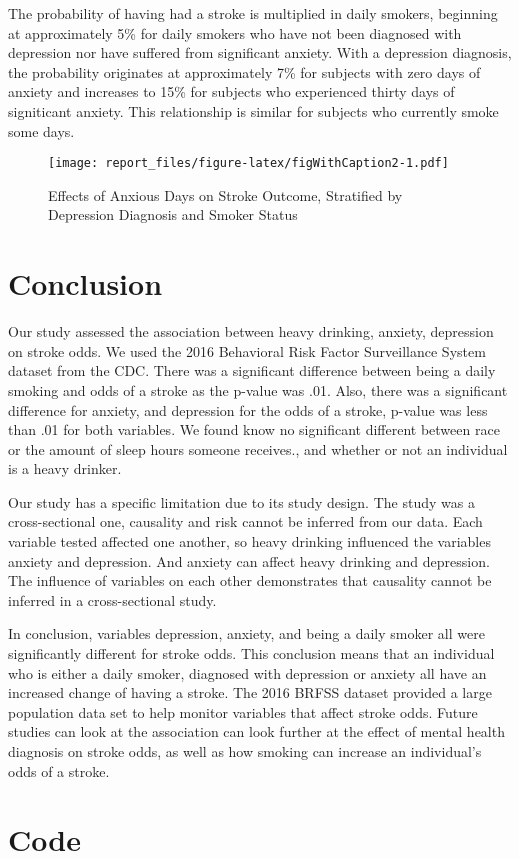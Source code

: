 \documentclass[11pt,]{article}
\begin{document}
The probability of having had a stroke is multiplied in daily smokers,
beginning at approximately 5\% for daily smokers who have not been
diagnosed with depression nor have suffered from significant anxiety.
With a depression diagnosis, the probability originates at approximately
7\% for subjects with zero days of anxiety and increases to 15\% for
subjects who experienced thirty days of signiticant anxiety. This
relationship is similar for subjects who currently smoke some days.

\begin{figure}
\centering
\texttt{[image: report\_files/figure-latex/figWithCaption2-1.pdf]}
\caption{Effects of Anxious Days on Stroke Outcome, Stratified by
Depression Diagnosis and Smoker Status}
\end{figure}

\section{Conclusion}\label{conclusion}

Our study assessed the association between heavy drinking, anxiety,
depression on stroke odds. We used the 2016 Behavioral Risk Factor
Surveillance System dataset from the CDC. There was a significant
difference between being a daily smoking and odds of a stroke as the
p-value was .01. Also, there was a significant difference for anxiety,
and depression for the odds of a stroke, p-value was less than .01 for
both variables. We found know no significant different between race or
the amount of sleep hours someone receives., and whether or not an
individual is a heavy drinker.

Our study has a specific limitation due to its study design. The study
was a cross-sectional one, causality and risk cannot be inferred from
our data. Each variable tested affected one another, so heavy drinking
influenced the variables anxiety and depression. And anxiety can affect
heavy drinking and depression. The influence of variables on each other
demonstrates that causality cannot be inferred in a cross-sectional
study.

In conclusion, variables depression, anxiety, and being a daily smoker
all were significantly different for stroke odds. This conclusion means
that an individual who is either a daily smoker, diagnosed with
depression or anxiety all have an increased change of having a stroke.
The 2016 BRFSS dataset provided a large population data set to help
monitor variables that affect stroke odds. Future studies can look at
the association can look further at the effect of mental health
diagnosis on stroke odds, as well as how smoking can increase an
individual's odds of a stroke.




\newpage
\singlespacing 


\appendix
\section{Code}
\end{document}
